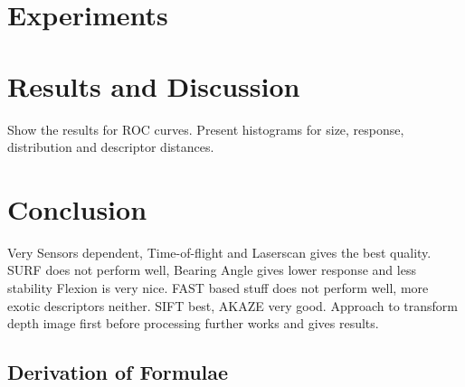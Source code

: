 \documentclass[doktyp=marbeit,fontsize=12pt,sprache=english,hausschrift=true]{TUBAFarbeiten}
\begin{document}
\section{Experiments}






\newpage

\section{Results and Discussion}\label{sec:results}

Show the results for ROC curves.
Present histograms for size, response, distribution and descriptor distances.





\newpage

\section{Conclusion}

Very Sensors dependent, Time-of-flight and Laserscan gives the best quality.
SURF does not perform well, Bearing Angle gives lower response and less stability
Flexion is very nice.
FAST based stuff does not perform well, more exotic descriptors neither.
SIFT best, AKAZE very good.
Approach to transform depth image first before processing further works and gives results.


\newpage

\begin{appendix}
    \renewcommand*{\thepage}{\thesection\arabic{page}}
    \renewcommand{\thetable}{\thesection\arabic{table}}
    \renewcommand{\thefigure}{\thesection\arabic{figure}}

    \newpage

    \section{Derivation of Formulae}
    

    \newpage

    
    

    \newpage
    \listoftables

    \newpage
    \listoffigures

    \newpage
\end{appendix}
\end{document}
